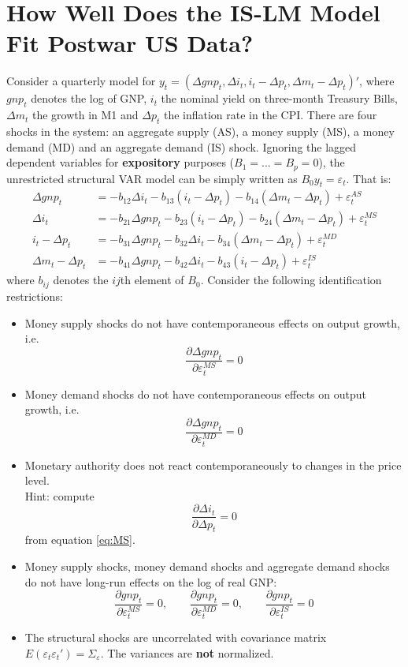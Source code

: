 \documentclass{article}
\begin{document}
\section{How Well Does the IS-LM Model Fit Postwar US Data?}
Consider a quarterly model for $y_t = (\Delta gnp_t, \Delta i_t, i_t-\Delta p_t, \Delta m_t - \Delta p_t)'$, where $gnp_t$ denotes the log of GNP, $i_t$ the nominal yield on three-month Treasury Bills, $\Delta m_t$ the growth in M1 and $\Delta p_t$ the inflation rate in the CPI. There are four shocks in the system: an aggregate supply (AS), a money supply (MS), a money demand (MD) and an aggregate demand (IS) shock. Ignoring the lagged dependent variables for \textbf{expository} purposes ($B_1=...=B_p=0$), the unrestricted structural VAR model can be simply written as $B_0 y_t = \varepsilon_t$. That is:
\begin{align}
\Delta gnp_t &= -b_{12}\Delta i_t -b_{13}(i_t-\Delta p_t) -b_{14}(\Delta m_t-\Delta p_t) + \varepsilon_t^{AS} \label{eq:AS}\\
\Delta i_t &= -b_{21}\Delta gnp_t -b_{23}(i_t-\Delta p_t) -b_{24}(\Delta m_t-\Delta p_t) + \varepsilon_t^{MS} \label{eq:MS}\\
i_t - \Delta p_t &= -b_{31}\Delta gnp_t -b_{32}\Delta i_t -b_{34}(\Delta m_t-\Delta p_t) + \varepsilon_t^{MD} \label{eq:MD}\\
\Delta m_t - \Delta p_t &= -b_{41}\Delta gnp_t -b_{42}\Delta i_t - b_{43} (i_t-\Delta p_t) + \varepsilon_t^{IS} \label{eq:IS}
\end{align}
where $b_{ij}$ denotes the $ij$th element of $B_0$. Consider the following identification restrictions:
\begin{itemize}
	\item Money supply shocks do not have contemporaneous effects on output growth, i.e.
	$$\frac{\partial \Delta gnp_t}{\partial \varepsilon_t^{MS}}=0$$	
	\item Money demand shocks do not have contemporaneous effects on output growth, i.e.
	$$\frac{\partial \Delta gnp_t}{\partial \varepsilon_t^{MD}}=0$$	
	\item Monetary authority does not react contemporaneously to changes in the price level.\\Hint: compute
	$$\frac{\partial \Delta i_t}{\partial \Delta p_t}=0$$
	from equation \eqref{eq:MS}.
	\item Money supply shocks, money demand shocks and aggregate demand shocks do not have long-run effects on the log of real GNP:	
	$$\frac{\partial gnp_t}{\partial \varepsilon_t^{MS}}=0,\qquad \frac{\partial gnp_t}{\partial \varepsilon_t^{MD}}=0,\qquad \frac{\partial gnp_t}{\partial \varepsilon_t^{IS}}=0$$	
	\item The structural shocks are uncorrelated with covariance matrix $E(\varepsilon_t \varepsilon_t')=\Sigma_\varepsilon$. The variances are \textbf{not} normalized.
\end{itemize}
\end{document}
